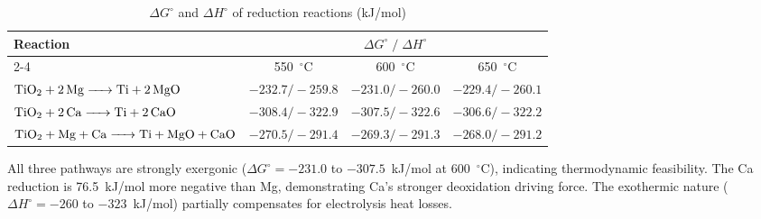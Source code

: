 \documentclass[sn-mathphys,Numbered]{sn-jnl}
\begin{document}
\begin{table}[!ht]
\centering
\footnotesize
\caption{$\Delta G^{\circ}$ and $\Delta H^{\circ}$ of reduction reactions (kJ/mol)}
\label{tab:thermo}
\begin{tabular}{lccc}
\toprule
\multirow{2}{*}{Reaction} & \multicolumn{3}{c}{$\Delta G^{\circ}\;/\;\Delta H^{\circ}$} \\
\cmidrule(lr){2-4}
 & 550~$^{\circ}$C & 600~$^{\circ}$C & 650~$^{\circ}$C \\
\midrule
$\ce{TiO2 + 2Mg -> Ti + 2MgO}$ & $-232.7/-259.8$ & $-231.0/-260.0$ & $-229.4/-260.1$ \\
$\ce{TiO2 + 2Ca -> Ti + 2CaO}$ & $-308.4/-322.9$ & $-307.5/-322.6$ & $-306.6/-322.2$ \\
$\ce{TiO2 + Mg + Ca -> Ti + MgO + CaO}$ & $-270.5/-291.4$ & $-269.3/-291.3$ & $-268.0/-291.2$ \\
\bottomrule
\end{tabular}
\end{table}

All three pathways are strongly exergonic ($\Delta G^{\circ} = -231.0$ to $-307.5$~kJ/mol at 600~$^{\circ}$C), indicating thermodynamic feasibility. The Ca reduction is 76.5~kJ/mol more negative than Mg, demonstrating Ca's stronger deoxidation driving force. The exothermic nature ($\Delta H^{\circ} = -260$ to $-323$~kJ/mol) partially compensates for electrolysis heat losses.
\end{document}
